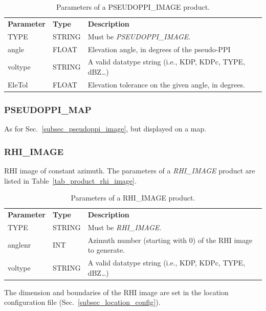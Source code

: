 \documentclass[a4paper,11pt,pdftex,twoside]{scrartcl}
\renewcommand{\bf}{\normalfont \bfseries}
\begin{document}
{{{\begin{table}[H]
 \begin{tabularx}{\textwidth}{llX}
 \bf{Parameter}  & \bf{Type}  & \bf{Description}\\
 TYPE           & STRING     & Must be \emph{PSEUDOPPI\_IMAGE}.\\
 angle          & FLOAT      & Elevation angle, in degrees of the pseudo-PPI \\
 voltype        & STRING     & A valid datatype string (i.e., KDP, KDPc, TYPE, dBZ\dots)\\
 EleTol         & FLOAT      & Elevation tolerance on the given angle, in degrees. \\
 \end{tabularx}
 \caption{Parameters of a PSEUDOPPI\_IMAGE product.}
 \label{tab_product_pseudoppi_image}
\end{table}

\subsubsection{PSEUDOPPI\_MAP}
   \label{subsec_pseudoppi_map}
As for Sec.~\ref{subsec_pseudoppi_image}, but displayed on a map.

\subsubsection*{RHI\_IMAGE}
   \label{subsec_rhi_image}
RHI image of constant azimuth.
The parameters of a \emph{RHI\_IMAGE} product are listed in Table~\ref{tab_product_rhi_image}.

\begin{table}[H]
 \begin{tabularx}{\textwidth}{llX}
 \bf{Parameter}  & \bf{Type}  & \bf{Description}\\
 TYPE           & STRING     & Must be \emph{RHI\_IMAGE}.\\
 anglenr        & INT        & Azimuth number (starting with 0) of the RHI image
                               to generate.\\
 voltype        & STRING     &  A valid datatype string (i.e., KDP, KDPc, TYPE, dBZ\dots)\\

 \end{tabularx}
 \caption{Parameters of a RHI\_IMAGE product.}
 \label{tab_product_ppi_image}
\end{table}
 The dimension and boundaries of the RHI image are set in the location configuration file (Sec.~\ref{subsec_location_config}).



}}}
\end{document}

